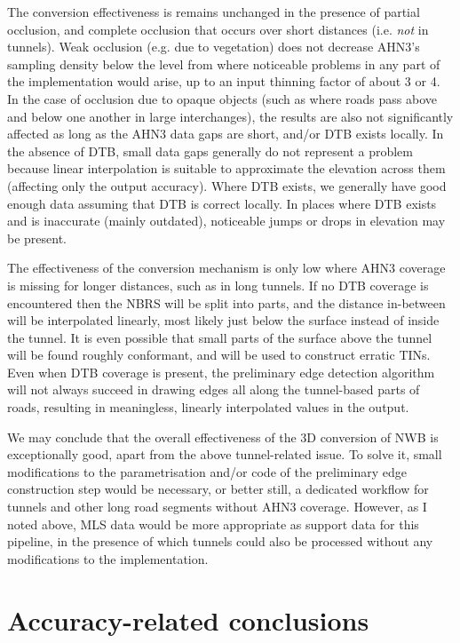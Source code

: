 The conversion effectiveness is remains unchanged in the presence of partial occlusion, and complete occlusion that occurs over short distances (i.e. \textit{not} in tunnels). Weak occlusion (e.g. due to vegetation) does not decrease AHN3's sampling density below the level from where noticeable problems in any part of the implementation would arise, up to an input thinning factor of about 3 or 4. In the case of occlusion due to opaque objects (such as where roads pass above and below one another in large interchanges), the results are also not significantly affected as long as the AHN3 data gaps are short, and/or DTB exists locally. In the absence of DTB, small data gaps generally do not represent a problem because linear interpolation is suitable to approximate the elevation across them (affecting only the output accuracy). Where DTB exists, we generally have good enough data assuming that DTB is correct locally. In places where DTB exists and is inaccurate (mainly outdated), noticeable jumps or drops in elevation may be present.

The effectiveness of the conversion mechanism is only low where AHN3 coverage is missing for longer distances, such as in long tunnels. If no DTB coverage is encountered then the NBRS will be split into parts, and the distance in-between will be interpolated linearly, most likely just below the surface instead of inside the tunnel. It is even possible that small parts of the surface above the tunnel will be found roughly conformant, and will be used to construct erratic TINs. Even when DTB coverage is present, the preliminary edge detection algorithm will not always succeed in drawing edges all along the tunnel-based parts of roads, resulting in meaningless, linearly interpolated values in the output.

We may conclude that the overall effectiveness of the 3D conversion of NWB is exceptionally good, apart from the above tunnel-related issue. To solve it, small modifications to the parametrisation and/or code of the preliminary edge construction step would be necessary, or better still, a dedicated workflow for tunnels and other long road segments without AHN3 coverage. However, as I noted above, MLS data would be more appropriate as support data for this pipeline, in the presence of which tunnels could also be processed without any modifications to the implementation.

\section{Accuracy-related conclusions}
\label{sec:conclusionsaccuracy}

